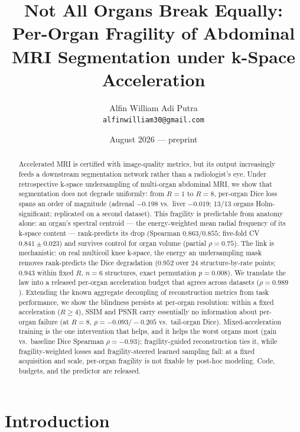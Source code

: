 \documentclass[10pt,twocolumn,letterpaper]{article}
\title{\textbf{Not All Organs Break Equally: Per-Organ Fragility of Abdominal MRI Segmentation under k-Space Acceleration}}
\author{Alfin William Adi Putra\\ \texttt{alfinwilliam30@gmail.com}}
\date{August 2026 --- preprint}
\begin{document}
\maketitle

\begin{abstract}
Accelerated MRI is certified with image-quality metrics, but its output increasingly feeds a downstream segmentation network rather than a radiologist's eye. Under retrospective k-space undersampling of multi-organ abdominal MRI, we show that segmentation does not degrade uniformly: from $R{=}1$ to $R{=}8$, per-organ Dice loss spans an order of magnitude (adrenal $-0.198$ vs.\ liver $-0.019$; 13/13 organs Holm-significant; replicated on a second dataset). This fragility is predictable from anatomy alone: an organ's spectral centroid --- the energy-weighted mean radial frequency of its k-space content --- rank-predicts its drop (Spearman $0.863/0.855$; five-fold CV $0.841\pm0.023$) and survives control for organ volume (partial $\rho{=}0.75$). The link is mechanistic: on real multicoil knee k-space, the energy an undersampling mask removes rank-predicts the Dice degradation ($0.952$ over 24 structure-by-rate points; $0.943$ within fixed $R$, $n{=}6$ structures, exact permutation $p{=}0.008$). We translate the law into a released per-organ acceleration budget that agrees across datasets ($\rho{=}0.989$). Extending the known aggregate decoupling of reconstruction metrics from task performance, we show the blindness persists at per-organ resolution: within a fixed acceleration ($R\geq4$), SSIM and PSNR carry essentially no information about per-organ failure (at $R{=}8$, $\rho{=}-0.093/-0.205$ vs.\ tail-organ Dice). Mixed-acceleration training is the one intervention that helps, and it helps the worst organs most (gain vs.\ baseline Dice Spearman $\rho{=}-0.93$); fragility-guided reconstruction ties it, while fragility-weighted losses and fragility-steered learned sampling fail: at a fixed acquisition and scale, per-organ fragility is not fixable by post-hoc modeling. Code, budgets, and the predictor are released.
\end{abstract}

\section{Introduction}
\label{sec:intro}
\end{document}
